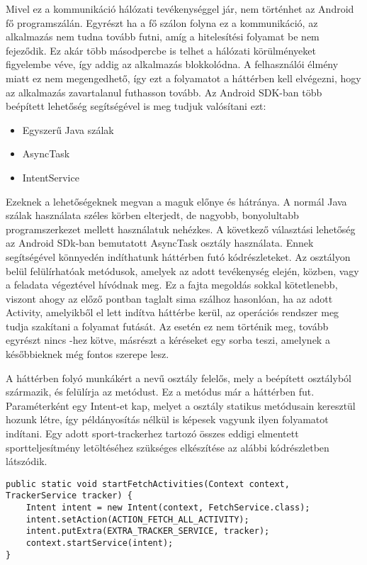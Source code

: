 Mivel ez a kommunikáció hálózati tevékenységgel jár, nem történhet az Android fő programszálán. 
Egyrészt ha a fő szálon folyna ez a kommunikáció, az alkalmazás nem tudna tovább futni, amíg a hitelesítési folyamat be nem fejeződik. 
Ez akár több másodpercbe is telhet a hálózati körülményeket figyelembe véve, így addig az alkalmazás blokkolódna. 
A felhasználói élmény miatt ez nem megengedhető, így ezt a folyamatot a háttérben kell elvégezni, hogy az alkalmazás zavartalanul futhasson tovább. 
Az Android SDK-ban több beépített lehetőség segítségével is meg tudjuk valósítani ezt:

\begin{itemize}
	\item Egyszerű Java szálak 
	\item AsyncTask 
	\item IntentService 
\end{itemize}

Ezeknek a lehetőségeknek megvan a maguk előnye és hátránya. 
A normál Java szálak használata széles körben elterjedt, de nagyobb, bonyolultabb programszerkezet mellett használatuk nehézkes. 
A következő választási lehetőség az Android SDk-ban bemutatott AsyncTask osztály használata. 
Ennek segítségével könnyedén indíthatunk háttérben futó kódrészleteket. 
Az osztályon belül felülírhatóak metódusok, amelyek az adott tevékenység elején, közben, vagy a feladata végeztével hívódnak meg. 
Ez a fajta megoldás sokkal kötetlenebb, viszont ahogy az előző pontban taglalt sima szálhoz hasonlóan, ha az adott Activity, amelyikből el lett indítva háttérbe kerül, az operációs rendszer meg tudja szakítani a folyamat futását. 
Az  esetén ez nem történik meg, tovább egyrészt nincs -hez kötve, másrészt a kéréseket egy sorba teszi, amelynek a későbbieknek még fontos szerepe lesz. 

A háttérben folyó munkákért a  nevű osztály felelős, mely a beépített  osztályból származik, és felülírja az  metódust. 
Ez a metódus már a háttérben fut. Paraméterként egy Intent-et kap, melyet a  osztály statikus metódusain keresztül hozunk létre, így példányosítás nélkül is képesek vagyunk ilyen folyamatot indítani. 
Egy adott sport-trackerhez tartozó összes eddigi elmentett sportteljesítmény letöltéséhez szükséges  elkészítése az alábbi kódrészletben látszódik. 

\begin{lstlisting}
public static void startFetchActivities(Context context, TrackerService tracker) {
    Intent intent = new Intent(context, FetchService.class);
    intent.setAction(ACTION_FETCH_ALL_ACTIVITY);
    intent.putExtra(EXTRA_TRACKER_SERVICE, tracker);
    context.startService(intent);
}
\end{lstlisting}

